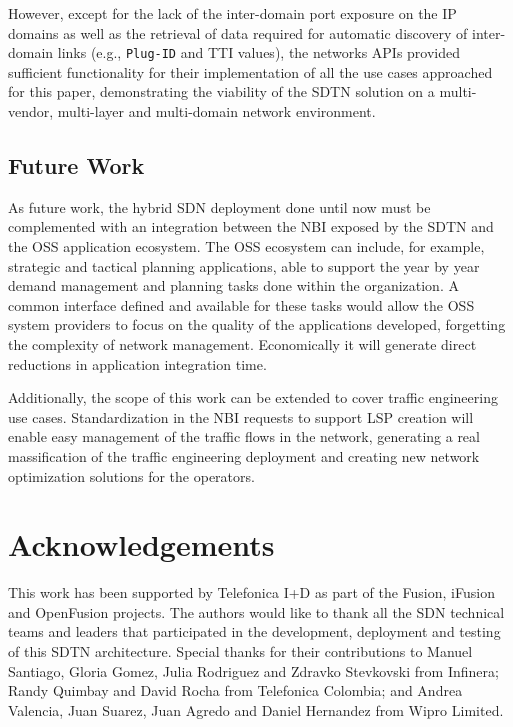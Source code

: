 \documentclass[a4paper,fleqn]{cas-dc}
\begin{document}
However, except for the lack of the inter-domain port exposure on the IP domains as well as the retrieval of data required for automatic discovery of inter-domain links (e.g., \texttt{Plug-ID} and TTI values), the networks APIs provided sufficient functionality for their implementation of all the use cases approached for this paper, demonstrating the viability of the SDTN solution on a multi-vendor, multi-layer and multi-domain network environment.

\subsection{Future Work}
As future work, the hybrid SDN deployment done until now must be complemented with an integration between the NBI exposed by the SDTN and the OSS application ecosystem. The OSS ecosystem can include, for example, strategic and tactical planning applications, able to support the year by year demand management and planning tasks done within the organization. A common interface defined and available for these tasks would allow the OSS system providers to focus on the quality of the applications developed, forgetting the complexity of network management. Economically it will generate direct reductions in application integration time.

Additionally, the scope of this work can be extended to cover traffic engineering use cases. Standardization in the NBI requests to support LSP creation will enable easy management of the traffic flows in the network, generating a real massification of the traffic engineering deployment and creating new network optimization solutions for the operators.

\printcredits

\section*{Acknowledgements}
This work has been supported by Telefonica I+D as part of the Fusion, iFusion and OpenFusion projects. The authors would like to thank all the SDN technical teams and leaders that participated in the development, deployment and testing of this SDTN architecture. Special thanks for their contributions to Manuel Santiago, Gloria Gomez, Julia Rodriguez and Zdravko Stevkovski from Infinera; Randy Quimbay and David Rocha from Telefonica Colombia; and Andrea Valencia, Juan Suarez, Juan Agredo and Daniel Hernandez from Wipro Limited.   


%
%

\end{document}
